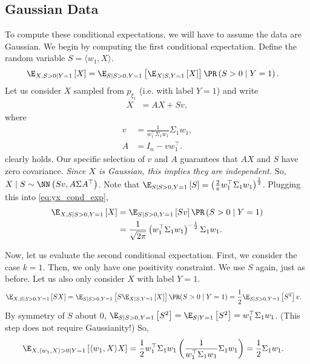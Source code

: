\documentclass{article}
\begin{document}
\subsection*{Gaussian Data}
To compute these conditional expectations, we will have to assume the data are Gaussian.
We begin by computing the first conditional expectation.
Define the random variable $S = \langle w_1, X \rangle$.
\begin{align} \label{eq:yx_cond_exp}
  \E_{X, S > 0 \mid Y=1} \left[ X \right]
  &= \E_{S \mid S > 0, Y=1} \left[ \E_{X \mid S, Y=1} \left[ X \right] \right]
  \PR\left( S > 0 \mid Y = 1 \right).
\end{align}
Let us consider $X$ sampled from $p_{\xi_1}$ (i.e. with label $Y=1$) and write
\begin{align}
  X &= AX + S v, \label{eq:X_rewrite}
\end{align}
where
\begin{align}
  v &= \frac{1}{ w_1^\top \Sigma_1 w_1 } \Sigma_1 w_1, \\
  A &= I_n - v w_1^\top.
\end{align}
 clearly holds.
Our specific selection of $v$ and $A$ guarantees that $A X$ and $S$ have zero covariance.
\emph{Since $X$ is Gaussian, this implies they are independent.}
So, $X \mid S \sim \NN\left( S v, A \Sigma A^\top \right)$.
Note that $\E_{S \mid S>0, Y=1} \left[ S \right] = \left( \frac{2}{\pi} w_1^\top \Sigma_1 w_1 \right)^{\frac{1}{2}}$.
Plugging this into \cref{eq:yx_cond_exp},
\begin{align}
  \E_{X, S \mid S > 0, Y=1} \left[ X \right]
  &= \E_{S \mid S>0, Y=1} \left[ S v \right] \PR\left( S > 0 \mid Y = 1  \right) \\
  &= \frac{1}{\sqrt{2 \pi}} \left( w_1^\top \Sigma_1 w_1 \right)^{-\frac{1}{2}} \Sigma_1 w_1.
\end{align}

Now, let us evaluate the second conditional expectation.
First, we consider the case $k=1$.
Then, we only have one positivity constraint.
We use $S$ again, just as before.
Let us also only consider $X$ with label $Y=1$.
\begin{align} \label{eq:xx_w1_cond_exp}
  \E_{X, S \mid S > 0, Y=1} \left[ S X \right]
  &= \E_{S \mid S > 0, Y=1} \left[ S \E_{X \mid S, Y=1} \left[ X \right] \right] \PR( S > 0 \mid Y = 1  )
  = \frac{1}{2} \E_{S \mid S > 0, Y=1} \left[ S^2 \right] v.
\end{align}
By symmetry of $S$ about 0, $\E_{S \mid S > 0, Y=1} \left[ S^2 \right] = \E_{S \mid Y=1} \left[ S^2 \right] = w_1^\top \Sigma_1 w_1$.
(This step does not require Gaussianity!)
So,
\begin{align}
  \E_{X,\langle w_1, X \rangle > 0 \mid Y=1} \left[ \langle w_1, X \rangle X \right]
  &= \frac{1}{2} w_1^\top \Sigma_1 w_1 \left( \frac{1}{ w_1^\top \Sigma_1 w_1 } \Sigma_1 w_1 \right)
  = \frac{1}{2} \Sigma_1 w_1.
\end{align}
\end{document}
